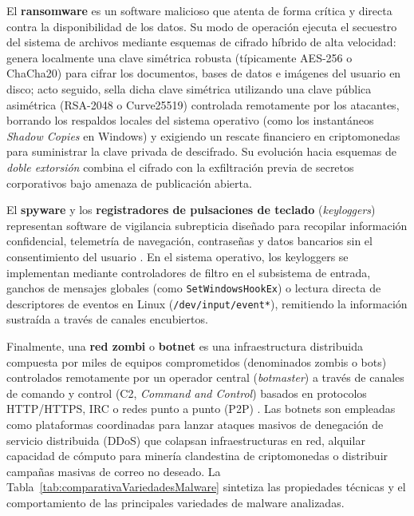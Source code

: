 \documentclass[12pt]{article}
\begin{document}
El \textbf{ransomware} es un software malicioso que atenta de forma crítica y directa contra la disponibilidad de los datos. Su modo de operación ejecuta el secuestro del sistema de archivos mediante esquemas de cifrado híbrido de alta velocidad: genera localmente una clave simétrica robusta (típicamente AES-256 o ChaCha20) para cifrar los documentos, bases de datos e imágenes del usuario en disco; acto seguido, sella dicha clave simétrica utilizando una clave pública asimétrica (RSA-2048 o Curve25519) controlada remotamente por los atacantes, borrando los respaldos locales del sistema operativo (como los instantáneos \textit{Shadow Copies} en Windows) y exigiendo un rescate financiero en criptomonedas para suministrar la clave privada de descifrado. Su evolución hacia esquemas de \textit{doble extorsión} combina el cifrado con la exfiltración previa de secretos corporativos bajo amenaza de publicación abierta.

El \textbf{spyware} y los \textbf{registradores de pulsaciones de teclado} (\textit{keyloggers}) representan software de vigilancia subrepticia diseñado para recopilar información confidencial, telemetría de navegación, contraseñas y datos bancarios sin el consentimiento del usuario \parencite[\S 15.2.1, p.\ 514]{silberschatz2006fundamentos}. En el sistema operativo, los keyloggers se implementan mediante controladores de filtro en el subsistema de entrada, ganchos de mensajes globales (como \texttt{SetWindowsHookEx}) o lectura directa de descriptores de eventos en Linux (\texttt{/dev/input/event*}), remitiendo la información sustraída a través de canales encubiertos.

Finalmente, una \textbf{red zombi} o \textbf{botnet} es una infraestructura distribuida compuesta por miles de equipos comprometidos (denominados zombis o bots) controlados remotamente por un operador central (\textit{botmaster}) a través de canales de comando y control (C2, \textit{Command and Control}) basados en protocolos HTTP/HTTPS, IRC o redes punto a punto (P2P) \parencite[\S 19.5.3, p.\ 945]{deitel2004operating}. Las botnets son empleadas como plataformas coordinadas para lanzar ataques masivos de denegación de servicio distribuida (DDoS) que colapsan infraestructuras en red, alquilar capacidad de cómputo para minería clandestina de criptomonedas o distribuir campañas masivas de correo no deseado. La Tabla~\ref{tab:comparativaVariedadesMalware} sintetiza las propiedades técnicas y el comportamiento de las principales variedades de malware analizadas.
\end{document}
